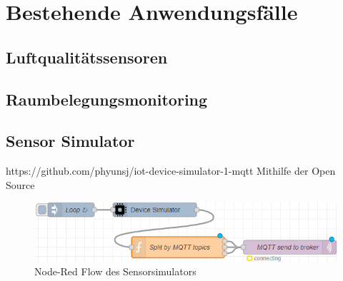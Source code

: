 \section{Bestehende Anwendungsfälle}

\subsection{Luftqualitätssensoren}

\subsection{Raumbelegungsmonitoring}

\subsection{Sensor Simulator}\label{chap:iotdevicesim}
https://github.com/phyunsj/iot-device-simulator-1-mqtt
Mithilfe der Open Source
\begin{figure}[H]
\centering
\includegraphics[width=\textwidth]{graphics/Device-Simulator-Flow.png}
\caption{Node-Red Flow des Sensorsimulators}
\label{abb:DeviceSimFlow}
\end{figure}


